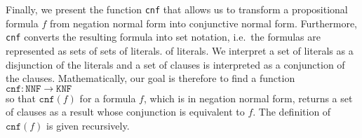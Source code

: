 Finally, we present the function \texttt{cnf} that allows us to transform a propositional formula $f$
from negation normal form into conjunctive normal form.
Furthermore, \texttt{cnf} converts the resulting formula
into set notation, i.e.~the formulas are represented as sets of sets of literals. 
of literals.  We interpret a set of literals as a
disjunction of the literals and a set of clauses is interpreted as a conjunction
of the clauses.  Mathematically, our goal is therefore to find a function
\\[0.2cm]
\hspace*{1.3cm}
$\texttt{cnf}: \texttt{NNF} \rightarrow \texttt{KNF}$
\\[0.2cm]
so that $\texttt{cnf}(f)$ for a formula $f$, which is in negation normal form, returns a set of clauses as a result whose conjunction
is equivalent to $f$.  The definition of $\texttt{cnf}(f)$ is given recursively.
